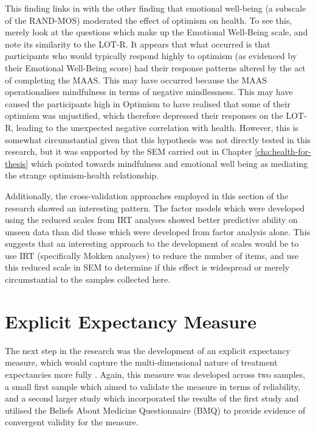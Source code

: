 This finding links in with the other finding that emotional well-being (a subscale of the RAND-MOS) moderated the effect of optimism on health. To see this, merely look at the questions which make up the Emotional Well-Being scale, and note its similarity to the LOT-R. It appears that what occurred is that participants who would typically respond highly to optimism (as evidenced by their Emotional Well-Being score) had their response patterns altered by the act of completing the MAAS. This may have occurred because the MAAS operationalises mindfulness in terms of negative mindlessness. This may have caused the participants high in Optimism to have realised that some of their optimism was unjustified, which therefore depressed their responses on the LOT-R, leading to the unexpected negative correlation with health. However, this is somewhat circumstantial given that this hypothesis was not directly tested in this research, but it was supported by the SEM carried out in Chapter \ref{cha:health-for-thesis} which pointed towards mindfulness and emotional well being as mediating the strange optimism-health relationship.

Additionally, the cross-validation approaches employed in this section of the research showed an interesting pattern. The factor models which were developed using the reduced scales from IRT analyses showed better predictive ability on unseen data than did those which were developed from factor analysis alone. This suggests that an interesting approach to the development of scales would be to use IRT (specifically Mokken analyses) to reduce the number of items, and use this reduced scale in SEM to determine if this effect is widespread or merely circumstantial to the samples collected here. 

\section{Explicit Expectancy Measure}
\label{sec:expl-expect-meas}

The next step in the research was the development of an explicit expectancy measure, which would capture the multi-dimensional nature of treatment expectancies more fully \cite{Stone2005}. Again, this measure was developed across two samples, a small first sample which aimed to validate the measure in terms of reliability, and a second larger study which incorporated the results of the first study and utilised the Beliefs About Medicine Questionnaire (BMQ) \cite{Horne1999} to provide evidence of convergent validity for the measure. 

